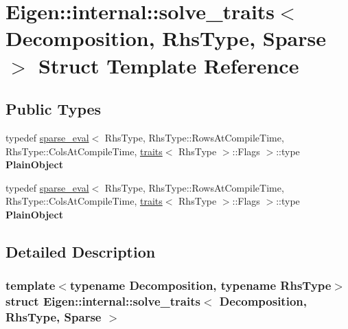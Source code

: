 \hypertarget{struct_eigen_1_1internal_1_1solve__traits_3_01_decomposition_00_01_rhs_type_00_01_sparse_01_4}{}\section{Eigen\+:\+:internal\+:\+:solve\+\_\+traits$<$ Decomposition, Rhs\+Type, Sparse $>$ Struct Template Reference}
\label{struct_eigen_1_1internal_1_1solve__traits_3_01_decomposition_00_01_rhs_type_00_01_sparse_01_4}
\subsection*{Public Types}
\begin{DoxyCompactItemize}
\item 
\mbox{\label{struct_eigen_1_1internal_1_1solve__traits_3_01_decomposition_00_01_rhs_type_00_01_sparse_01_4_a13429a22c8c4dcf69f196b594bbecd7e}} 
typedef \hyperlink{struct_eigen_1_1internal_1_1sparse__eval}{sparse\+\_\+eval}$<$ Rhs\+Type, Rhs\+Type\+::\+Rows\+At\+Compile\+Time, Rhs\+Type\+::\+Cols\+At\+Compile\+Time, \hyperlink{struct_eigen_1_1internal_1_1traits}{traits}$<$ Rhs\+Type $>$\+::Flags $>$\+::type {\bfseries Plain\+Object}
\item 
\mbox{\label{struct_eigen_1_1internal_1_1solve__traits_3_01_decomposition_00_01_rhs_type_00_01_sparse_01_4_a13429a22c8c4dcf69f196b594bbecd7e}} 
typedef \hyperlink{struct_eigen_1_1internal_1_1sparse__eval}{sparse\+\_\+eval}$<$ Rhs\+Type, Rhs\+Type\+::\+Rows\+At\+Compile\+Time, Rhs\+Type\+::\+Cols\+At\+Compile\+Time, \hyperlink{struct_eigen_1_1internal_1_1traits}{traits}$<$ Rhs\+Type $>$\+::Flags $>$\+::type {\bfseries Plain\+Object}
\end{DoxyCompactItemize}


\subsection{Detailed Description}
\subsubsection*{template$<$typename Decomposition, typename Rhs\+Type$>$\newline
struct Eigen\+::internal\+::solve\+\_\+traits$<$ Decomposition, Rhs\+Type, Sparse $>$}



